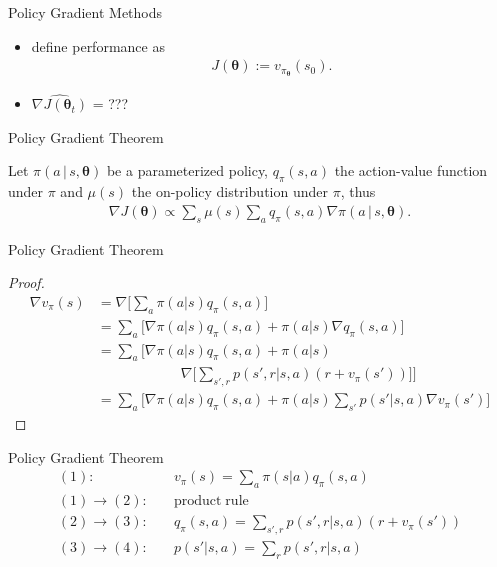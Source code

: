 \documentclass{beamer}
\begin{document}
\begin{frame}{Policy Gradient Methods}
\begin{itemize}
\item define performance as
\begin{align*}
J(\boldsymbol{\theta}) := v_{\pi_{\boldsymbol{\theta}}}(s_0).
\end{align*}
\pause
\item $\widehat{\nabla J(\boldsymbol{\theta}_t)}$ = ???
\end{itemize}
\end{frame}

\begin{frame}{Policy Gradient Theorem}
\begin{theorem}
Let $\pi(a\,|\, s, \boldsymbol{\theta})$ be a parameterized policy, $q_{\pi}(s,a)$ the action-value function under $\pi$ and $\mu(s)$ the on-policy distribution under $\pi$, thus
\begin{align*}
\nabla J(\boldsymbol{\theta}) \propto \sum_s \mu(s) \sum_a q_{\pi}(s,a) \nabla \pi(a\, | \, s, \boldsymbol{\theta}).
\end{align*}

\end{theorem}
\end{frame}
\begin{frame}{Policy Gradient Theorem}
\begin{proof}
\renewcommand{\qedsymbol}{}
\begin{align}
\nabla v_{\pi}(s) &= \nabla \Big[\sum_a \pi (a|s) q_{\pi}(s,a) \Big]\\
&= \sum_a \Big[ \nabla \pi(a|s) q_{\pi}(s,a) +  \pi(a|s) \nabla q_{\pi}(s,a) \Big]\\
&= \sum_a \Big[ \nabla \pi(a|s) q_{\pi}(s,a) +  \pi(a|s) \nonumber\\
& \qquad \qquad \qquad \nabla \Big[\sum_{s',r} p(s',r|s,a)\left(r+v_{\pi}(s')\right) \Big]\Big]\\
&= \sum_a \Big[ \nabla \pi(a|s) q_{\pi}(s,a) +  \pi(a|s) \sum_{s'} p(s'|s,a) \nabla v_{\pi}(s') \Big]
\end{align}

\end{proof}
\end{frame}
\begin{frame}{Policy Gradient Theorem}
\begin{align*}
(1):\quad & v_{\pi}(s) = \sum_a \pi(s|a)q_{\pi}(s,a)\\
(1) \to (2):\quad & \mathrm{product\; rule}\\
(2) \to (3):\quad & q_{\pi}(s,a) = \sum_{s',r} p(s',r|s,a)\left(r+v_{\pi}(s')\right)\\
(3) \to (4):\quad & p(s'|s,a) = \sum_r p(s',r|s,a)
\end{align*}
\end{frame}
\end{document}
